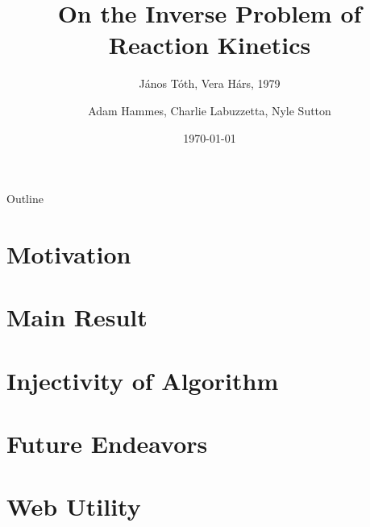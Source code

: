 \documentclass[11pt]{beamer}
\title{On the Inverse Problem of Reaction Kinetics}
\subtitle{J{\'a}nos T{\'o}th, Vera H{\'a}rs, 1979}
\author{Adam Hammes, Charlie Labuzzetta, Nyle Sutton}
\institute{Iowa State University}
\date{\today}
\begin{document}
	
	\begin{frame}
		\titlepage
	\end{frame}
	
	\begin{frame}{Outline}
		\tableofcontents
	\end{frame}
	
	\section{Motivation}
	\begin{frame}
	\end{frame}
	
	\section{Main Result}
	
	
	
	
	
	
	\section{Injectivity of Algorithm}

	
	
	
	
	\section{Future Endeavors}
	\begin{frame}
	\end{frame}
	
	\section{Web Utility}
	\begin{frame}
	\end{frame}
	
\end{document}
